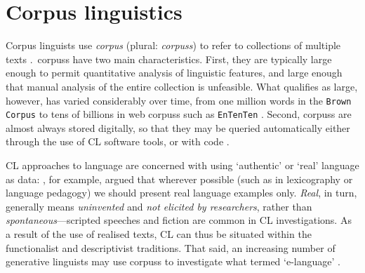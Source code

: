 
\section{Corpus linguistics} \label{sect:cl}



Corpus linguists use \emph{\gls{corpus}} (plural: \emph{\glspl{corpus}}) to refer to collections of multiple texts \cite{mcenery_corpus_1996}.~\Glspl{corpus} have two main characteristics. First, they are typically large enough to permit quantitative analysis of linguistic features, and large enough that manual analysis of the entire collection is unfeasible. What qualifies as large, however, has varied considerably over time, from one million words in the \texttt{Brown Corpus} \cite[see][]{francis1979brown} to tens of billions in web \glspl{corpus} such as \texttt{EnTenTen} \cite[see][]{jakubivcek2013tenten}. Second, \glspl{corpus} are almost always stored digitally, so that they may be queried automatically either through the use of \gls{CL} software tools, or with code \cite{butler_corpus_2004}.

\gls{CL} approaches to language are concerned with using `authentic' or `real' language as data: \textcite{sinclair_corpus_1997}, for example, argued that wherever possible (such as in lexicography or language pedagogy) we should present real language examples only. \emph{Real}, in turn, generally means \emph{uninvented} and \emph{not elicited by researchers}, rather than \emph{spontaneous}---scripted speeches and fiction are common in \gls{CL} investigations. As a result of the use of realised texts, \gls{CL} can thus be situated within the functionalist and descriptivist traditions. That said, an increasing number of generative linguists may use \glspl{corpus} to investigate what \textcite{chomsky_knowledge_1986} termed `e\hyp{}language' \cite{meyer_english_2002}.

